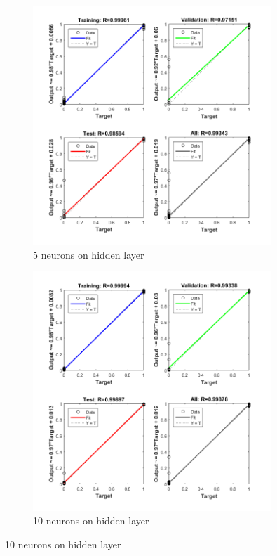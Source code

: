 \documentclass[12pt]{article}
\begin{document}
	\begin{figure}[H]
	\centering
	\begin{subfigure}{9cm}
	\centering\includegraphics[width=9cm]{images/regression5_1.png}
	\caption{5 neurons on hidden layer}
	\end{subfigure}%
	\begin{subfigure}{9cm}
	\centering\includegraphics[width=9cm]{images/regression10_1.png}
	\caption{10 neurons on hidden layer}
	\end{subfigure}\vspace{10pt}
	 

\end{figure}
\end{document}
